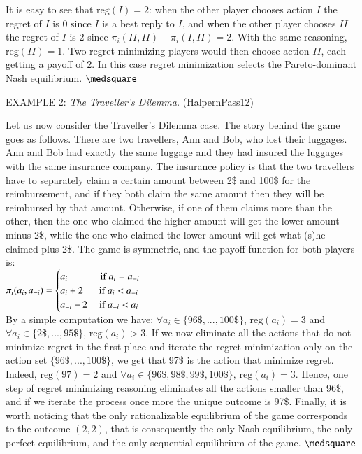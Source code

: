 \documentclass[fleqn,reqno,11pt]{article}
\begin{document}
It is easy to see that $\text{reg}(I)=2$: when the other player chooses action $I$ the regret of $I$ is $0$ since $I$ is a best reply to $I$, and when the other player chooses $II$ the regret of $I$ is $2$ since $\pi_i(II,II)-\pi_i(I,II)=2$. With the same reasoning, $\text{reg}(II)=1$. Two regret minimizing players would then choose action $II$, each getting a payoff of $2$. In this case regret minimization selects the Pareto-dominant Nash equilibrium. $ \medsquare $

\vspace{.5cm}

EXAMPLE 2: \textit{The Traveller's Dilemma.} (HalpernPass12)

Let us now consider the Traveller's Dilemma case. The story behind the game goes as follows. There are two travellers, Ann and Bob, who lost their luggages. Ann and Bob had exactly the same luggage and they had insured the luggages with the same insurance company. The insurance policy is that the two travellers have to separately claim a certain amount between 2\$ and 100\$ for the reimbursement, and if they both claim the same amount then they will be reimbursed by that amount. Otherwise, if one of them claims more than the other, then the one who claimed the higher amount will get the lower amount minus 2\$, while the one who claimed the lower amount will get what (s)he claimed plus 2\$. The game is symmetric, and the payoff function for both players is:\\
$\pi_i(a_i,a_{-i}) =  \begin{cases} a_i \text{ \hspace{1cm} if } a_i = a_{-i} \\ a_i + 2 \text{ \hspace{.4cm} if } a_i < a_{-i} \\ a_{-i} -2 \text{ \hspace{.25cm} if } a_{-i} < a_i \end{cases}$ \\
By a simple computation we have:  $\forall a_i \in \lbrace 96\$, ..., 100\$ \rbrace \text{, } \text{reg}(a_i)=3 $ and $\forall a_i \in \lbrace 2\$, ..., 95\$ \rbrace \text{, } \text{reg}(a_i)>3$. If we now eliminate all the actions that do not minimize regret in the first place and iterate the regret minimization only on the action set $\lbrace 96\$, ..., 100\$ \rbrace$, we get that 97\$ is the action that minimize regret. Indeed, $\text{reg}(97)=2$ and $\forall a_i \in \lbrace 96\$, 98\$, 99\$, 100\$ \rbrace \text{, } \text{reg}(a_i)=3 $. Hence, one step of regret minimizing reasoning eliminates all the actions smaller than 96\$, and if we iterate the process once more the unique outcome is 97\$. Finally, it is worth noticing that the only rationalizable equilibrium of the game corresponds to the outcome $(2,2)$, that is consequently the only Nash equilibrium, the only perfect equilibrium, and the only sequential equilibrium of the game. $ \medsquare $\\ 
\end{document}
